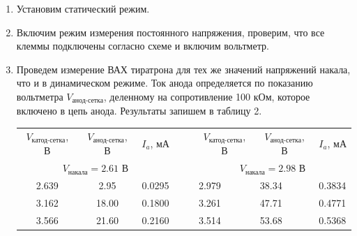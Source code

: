 \documentclass[12pt,a4paper]{article}
\begin{document}
	\begin{enumerate}
		\item Установим статический режим.
		
		\item Включим режим измерения постоянного напряжения, проверим, что все клеммы подключены согласно схеме и включим вольтметр.
		
		\item Проведем измерение ВАХ тиратрона для тех же значений напряжений накала, что и в динамическом режиме. Ток анода определяется по показанию вольтметра $V_\text{анод-сетка}$, деленному на сопротивление 100 кОм, которое включено в цепь анода. Результаты запишем в таблицу 2.
		
		\begin{table}[h!]
			\centering
			\begin{tabular}{ccccc|lll|}
				\cline{1-3} \cline{6-8}
				\multicolumn{1}{|c|}{$V_\text{катод-сетка}$, В} & \multicolumn{1}{c|}{$V_\text{анод-сетка}$, В} & \multicolumn{1}{c|}{$I_a$, мА} &  &  & \multicolumn{1}{c|}{$V_\text{катод-сетка}$, В} & \multicolumn{1}{c|}{$V_\text{анод-сетка}$, В} & \multicolumn{1}{c|}{$I_a$, мА} \\ \cline{1-3} \cline{6-8} 
				\multicolumn{3}{|c|}{$V_\text{накала} = 2.61$ В}                                                                                 &  &  & \multicolumn{3}{c|}{$V_\text{накала} = 2.98$ В}                                                                                 \\ \cline{1-3} \cline{6-8} 
				\multicolumn{1}{|c|}{2.639}                     & \multicolumn{1}{c|}{2.95}                     & \multicolumn{1}{c|}{0.0295}    &  &  & \multicolumn{1}{l|}{2.979}                     & \multicolumn{1}{l|}{38.34}                    & 0.3834                         \\ \cline{1-3} \cline{6-8} 
				\multicolumn{1}{|c|}{3.162}                     & \multicolumn{1}{c|}{18.00}                       & \multicolumn{1}{c|}{0.1800}      &  &  & \multicolumn{1}{l|}{3.261}                     & \multicolumn{1}{l|}{47.71}                    & 0.4771                         \\ \cline{1-3} \cline{6-8} 
				\multicolumn{1}{|c|}{3.566}                     & \multicolumn{1}{c|}{21.60}                     & \multicolumn{1}{c|}{0.2160}     &  &  & \multicolumn{1}{l|}{3.514}                     & \multicolumn{1}{l|}{53.68}                    & 0.5368                         \\ \cline{1-3} \cline{6-8} 

\end{tabular}
\end{table}
\end{enumerate}
\end{document}
